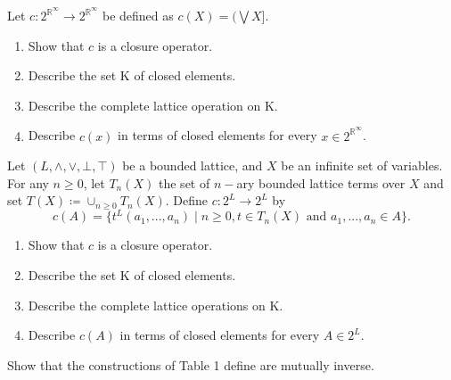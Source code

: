 \documentclass[11pt,a4paper]{exam}
\newcommand{\R}{\mathbb{R}}
\newcommand{\join}{\vee}
\newcommand{\meet}{\wedge}
\newcommand{\union}{\cup}
\newcommand{\bigjoin}{{\textstyle\bigvee}}
\begin{document}
\begin{exo}
    Let $c \colon 2^{\R^\infty} \rightarrow 2^{\R^\infty}$ be defined as $c(X) = (\bigjoin X]$.
    \begin{enumerate}
        \item Show that $c$ is a closure operator.
        \item Describe the set K of closed elements. 
        \item Describe the complete lattice operation on K.
        \item Describe $c(x)$ in terms of closed elements for every $x \in 2^{\R^\infty}$.
    \end{enumerate}

    \begin{sol}
        
    \end{sol}
\end{exo}

\begin{exo}
    Let $(L, \meet, \join, \bot, \top)$ be a bounded lattice, and $X$ be an infinite set of variables. For any $n \geq 0$, let $T_n(X)$ the set of $n-$ary bounded lattice terms over $X$ and set $T(X) \coloneqq \union_{n \geq 0}T_n(X)$. Define $c \colon 2^L \rightarrow 2^L$ by 
    \[
        c(A) = \{t^L(a_1,...,a_n) \mid n \geq 0, t \in T_n(X) \text{ and } a_1,...,a_n \in A\}.
    \]
    \begin{enumerate}
        \item Show that $c$ is a closure operator.
        \item Describe the set K of closed elements.
        \item Describe the complete lattice operations on K. 
        \item Describe $c(A)$ in terms of closed elements for every $A \in 2^L$.
    \end{enumerate}

    \begin{sol}
        
    \end{sol}
\end{exo}

\begin{exo}
    Show that the constructions of Table 1 define are mutually inverse.

    \begin{sol}
        
    \end{sol}
\end{exo}
\end{document}
